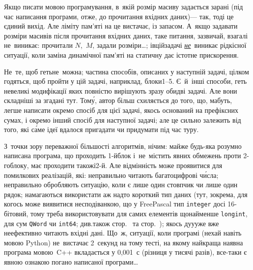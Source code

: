 Якщо писати мовою програмування, в~якій розмір масиву задається зарані (під час написання програми, отже, до прочитання вхідних даних)\nolinebreak[3] --- так, тоді це єдиний вихід. Але ліміту пам'яті на це вистачає, із запасом. А~якщо задавати розміри масивів після прочитання вхідних даних, таке питання, зазвичай, взагалі не~виникає: прочитали $N$,~$M$, задали розміри\dots{}; і\nolinebreak[2] в\nolinebreak[3] цій\nolinebreak[2] задачі \underline{\emph{не}}~виникає рідкісної ситуації, коли заміна динамічної пам'яті на статичну дає істотне прискорення.

Не~те, щоб геть\nolinebreak[2] не~можна; частина способів, описаних у наступній задачі, цілком годяться, щоб пройти у цій задачі, наприклад, блоки\nolinebreak[3] \mbox{1--5}. Є~й~інші способи, геть невеликі модифікації яких повністю вирішують зразу обидві задачі. Але вони складніші за згадані тут. Том\'{у}, автор більш схиляється до того, що, мабуть, легше написати окремо спосіб для цієї задачі, якось оснований на префіксних сумах, і окремо інший спосіб для наступної задачі; але це сильно залежить від того, які с\'{а}ме ідеї вдалося пригадати чи придумати під час туру.

 З~точки зору переважної більшості алгоритмів, нічим: майже будь-яка розумно написана програма, що проходить \mbox{1-й}\nolinebreak[3] блок і~не~містить явних обмежень проти \mbox{2-го}\nolinebreak[3] блоку, має проходити також\nolinebreak[3] і\nolinebreak[3] \mbox{2-й}. Але відмінність може проявитися для помилкових реалізацій, які: неправильно читають багатоцифрові ч\'{и}сла; неправильно обробляють ситуацію, коли є лише один стовпчик чи лише один рядок;  намагаються використати аж надто короткий тип даних (тут, зокрема, для когось може виявитися несподіванкою, що у FreePascal тип \texttt{integer} досі 16-бітовий, тому треба використовувати для самих елементів щонайменше \texttt{longint}, для сум \texttt{QWord} чи \texttt{int64}; див.\nolinebreak[3] також стор.~\pageref{text:overflow-example} та стор.~\pageref{text:notes-about-delphi-mode}); якось дуууже вже неефективно читають вхідні дані. Що~ж, ситуації, коли програмі (нехай навіть мовою Python) не~вистачає 2~секунд на тому тесті, на якому найкраща наявна програма мовою~C++ вкладається у 0,001~с (різниця у тисячі разів), все-таки є явною ознакою погано написаної програми\dots